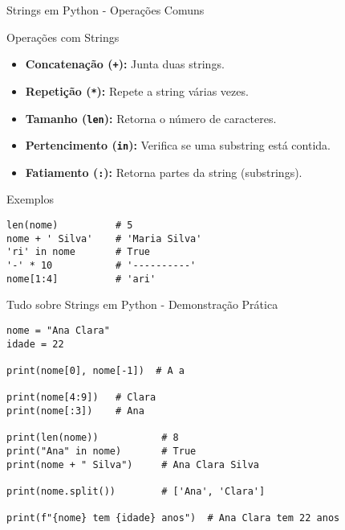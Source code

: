 \begin{frame}[fragile]{Strings em Python - Operações Comuns}


    
    \begin{block}{Operações com Strings}
        \begin{itemize}
            \item \textbf{Concatenação (\texttt{+}):} Junta duas strings.
            \item \textbf{Repetição (\texttt{*}):} Repete a string várias vezes.
            \item \textbf{Tamanho (\texttt{len}):} Retorna o número de caracteres.
            \item \textbf{Pertencimento (\texttt{in}):} Verifica se uma substring está contida.
            \item \textbf{Fatiamento (\texttt{:}):} Retorna partes da string (substrings).
        \end{itemize}
    \end{block}


    \begin{block}{Exemplos}
\begin{verbatim}
len(nome)          # 5
nome + ' Silva'    # 'Maria Silva'
'ri' in nome       # True
'-' * 10           # '----------'
nome[1:4]          # 'ari'
\end{verbatim}
    \end{block}


\end{frame}


\begin{frame}[fragile]{Tudo sobre Strings em Python - Demonstração Prática}



\begin{verbatim}
nome = "Ana Clara"
idade = 22

print(nome[0], nome[-1])  # A a

print(nome[4:9])   # Clara
print(nome[:3])    # Ana

print(len(nome))           # 8
print("Ana" in nome)       # True
print(nome + " Silva")     # Ana Clara Silva

print(nome.split())        # ['Ana', 'Clara']

print(f"{nome} tem {idade} anos")  # Ana Clara tem 22 anos
\end{verbatim}
\end{frame}

